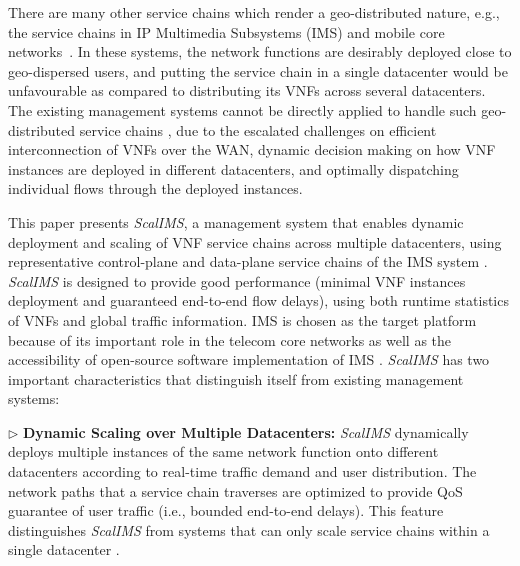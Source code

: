   There are many other service chains which render a geo-distributed nature, e.g., the service chains in IP Multimedia Subsystems (IMS) \cite{3gpp-ims} and mobile core networks~\cite{epc}. In these systems, the network functions are desirably deployed close to geo-dispersed users, %
 and putting the service chain in a single datacenter would be unfavourable as compared to distributing its VNFs across several datacenters. %
 The existing management systems cannot be directly applied to handle such geo-distributed service chains \cite{qazi2016klein}, due to the escalated challenges on efficient interconnection of VNFs over the WAN, dynamic decision making on how VNF instances are deployed in different datacenters, and optimally dispatching individual flows through the deployed instances.




This paper presents \textit{ScalIMS}, a management system that enables dynamic deployment and scaling of VNF service chains across multiple datacenters, using representative control-plane and data-plane service chains of the IMS system \cite{3gpp-ims}. \textit{ScalIMS} is designed to provide good performance (minimal VNF instances deployment and guaranteed end-to-end flow delays), using both runtime statistics of VNFs and global traffic information. IMS is chosen as the target platform because of its important role in the telecom core networks as well as the accessibility of open-source software implementation of IMS \cite{project-clearwater}. \textit{ScalIMS} has two important characteristics that distinguish itself from existing management systems:

$\triangleright$ \textbf{Dynamic Scaling over Multiple Datacenters:} \textit{ScalIMS} dynamically deploys multiple instances of the same network function onto different datacenters according to real-time traffic demand and user distribution. The network paths that a service chain traverses are optimized to provide QoS guarantee of user traffic (i.e., bounded end-to-end delays). This feature distinguishes \textit{ScalIMS} from systems that can only scale service chains within a single datacenter \cite{palkar2015e2, gember2012stratos}.

